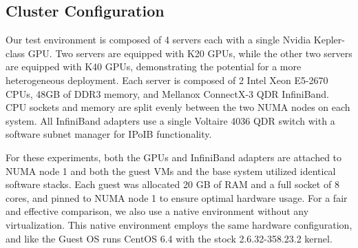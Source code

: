 \documentclass[10pt]{sigplanconf}
\begin{document}



\subsection{Cluster Configuration}

Our test environment is composed of 4 servers each with a single Nvidia
Kepler-class GPU.  Two servers are equipped with K20 GPUs, while the other two
servers are equipped with K40 GPUs, demonstrating the potential for a more
heterogeneous deployment.  Each server is composed of 2 Intel Xeon E5-2670 CPUs,
48GB of DDR3 memory, and Mellanox ConnectX-3 QDR InfiniBand.  CPU sockets and
memory are split evenly between the two NUMA nodes on each system. All
InfiniBand adapters use a single Voltaire 4036 QDR switch with a software subnet
manager for IPoIB functionality.   


For these experiments, both the GPUs and InfiniBand adapters are attached to NUMA node 1 and both the guest VMs and the base system utilized identical software stacks.  Each guest was allocated 20 GB of RAM and a full socket of 8 cores, and pinned to NUMA node 1 to ensure optimal hardware usage. 
For a fair and effective comparison, we also use a native environment without any virtualization. This native environment employs the same hardware configuration, and like the Guest OS runs CentOS 6.4 with the stock 2.6.32-358.23.2 kernel. 
\end{document}

